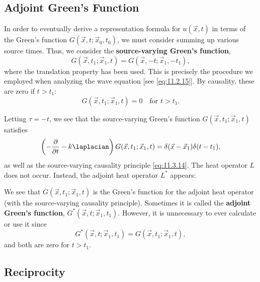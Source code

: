 \subsection{Adjoint Green's Function}
\label{subsec:adjoint-greens-heat}

In order to eventually derive a representation formula for $u(\vec{x},t)$ in terms of the Green's function $G(\vec{x},t;\vec{x}_0,t_0)$, we must consider summing up various source times.  Thus, we consider the \textbf{source-varying Green's function},
\[
G(\vec{x},t_1;\vec{x}_1,t) = G(\vec{x},-t;\vec{x}_1,-t_1),
\]
where the translation property has been used.  This is precisely the procedure we employed when analyzing the wave equation [see \eqref{eq:11.2.15}].  By causality, these are zero if $t > t_1$:
\begin{equation}
\label{eq:11.3.14}
G(\vec{x},t_1;\vec{x}_1,t) = 0 \quad \text{for } t > t_1.
\end{equation}

Letting $\tau = -t$, we see that the source-varying Green's function $G(\vec{x},t_1;\vec{x}_1,t)$ satisfies
\begin{equation}
\label{eq:11.3.15}
\left(-\frac{\partial}{\partial t} - k\laplacian\right) G(\vec{x},t_1;\vec{x}_1,t) = \delta(\vec{x} - \vec{x}_1)\delta(t - t_1),
\end{equation}
as well as the source-varying causality principle \eqref{eq:11.3.14}.  The heat operator $L$ does not occur.  Instead, the adjoint heat operator $L^*$ appears:

We see that $G(\vec{x},t_1;\vec{x}_1,t)$ is the Green's function for the adjoint heat operator (with the source-varying causality principle).  Sometimes it is called the \textbf{adjoint Green's function}, $G^*(\vec{x},t;\vec{x}_1,t_1)$.  However, it is unnecessary to ever calculate or use it since
\begin{equation}
\label{eq:11.3.17}
G^*(\vec{x},t;\vec{x}_1,t_1) = G(\vec{x},t_1;\vec{x}_1,t),
\end{equation}
and both are zero for $t > t_1$.

\subsection{Reciprocity}
\label{subsec:heat-reciprocity}

